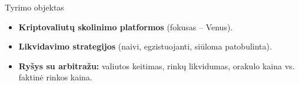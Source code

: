 \documentclass[12pt]{beamer}
\begin{document}
\begin{frame}{Tyrimo objektas}
  \begin{itemize}
    \item \textbf{Kriptovaliutų skolinimo platformos} (fokusas – Venus).
    \item \textbf{Likvidavimo strategijos} (naivi, egzistuojanti, siūloma patobulinta).
    \item \textbf{Ryšys su arbitražu:} valiutos keitimas, rinkų likvidumas, orakulo kaina vs. faktinė rinkos kaina.
  \end{itemize}
\end{frame}




    
\end{document}
